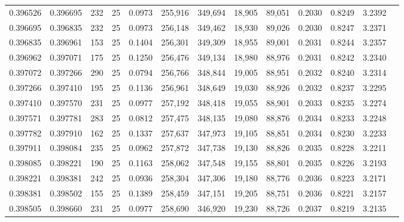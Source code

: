 \begin{tabular}{rrrrrrrrrrrrr}
0.396526 & 0.396695 &   232 &  25 &                                     0.0973 & 255,916 & 349,694 &  18,905 &  89,051 & 0.2030 & 0.8249 & 3.2392 \\
0.396695 & 0.396835 &   232 &  25 &                                     0.0973 & 256,148 & 349,462 &  18,930 &  89,026 & 0.2030 & 0.8247 & 3.2371 \\
0.396835 & 0.396961 &   153 &  25 &                                     0.1404 & 256,301 & 349,309 &  18,955 &  89,001 & 0.2031 & 0.8244 & 3.2357 \\
0.396962 & 0.397071 &   175 &  25 &                                     0.1250 & 256,476 & 349,134 &  18,980 &  88,976 & 0.2031 & 0.8242 & 3.2340 \\
0.397072 & 0.397266 &   290 &  25 &                                     0.0794 & 256,766 & 348,844 &  19,005 &  88,951 & 0.2032 & 0.8240 & 3.2314 \\
0.397266 & 0.397410 &   195 &  25 &                                     0.1136 & 256,961 & 348,649 &  19,030 &  88,926 & 0.2032 & 0.8237 & 3.2295 \\
0.397410 & 0.397570 &   231 &  25 &                                     0.0977 & 257,192 & 348,418 &  19,055 &  88,901 & 0.2033 & 0.8235 & 3.2274 \\
0.397571 & 0.397781 &   283 &  25 &                                     0.0812 & 257,475 & 348,135 &  19,080 &  88,876 & 0.2034 & 0.8233 & 3.2248 \\
0.397782 & 0.397910 &   162 &  25 &                                     0.1337 & 257,637 & 347,973 &  19,105 &  88,851 & 0.2034 & 0.8230 & 3.2233 \\
0.397911 & 0.398084 &   235 &  25 &                                     0.0962 & 257,872 & 347,738 &  19,130 &  88,826 & 0.2035 & 0.8228 & 3.2211 \\
0.398085 & 0.398221 &   190 &  25 &                                     0.1163 & 258,062 & 347,548 &  19,155 &  88,801 & 0.2035 & 0.8226 & 3.2193 \\
0.398221 & 0.398381 &   242 &  25 &                                     0.0936 & 258,304 & 347,306 &  19,180 &  88,776 & 0.2036 & 0.8223 & 3.2171 \\
0.398381 & 0.398502 &   155 &  25 &                                     0.1389 & 258,459 & 347,151 &  19,205 &  88,751 & 0.2036 & 0.8221 & 3.2157 \\
0.398505 & 0.398660 &   231 &  25 &                                     0.0977 & 258,690 & 346,920 &  19,230 &  88,726 & 0.2037 & 0.8219 & 3.2135 \\

\end{tabular}
